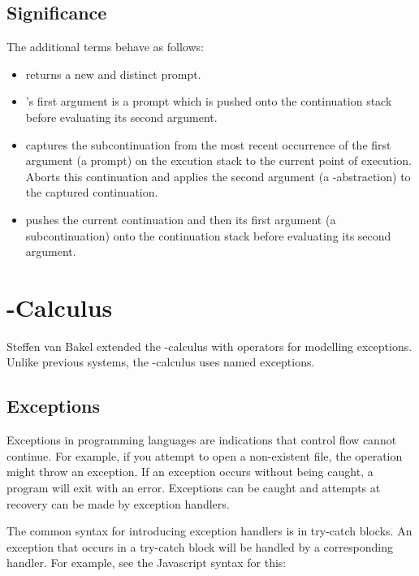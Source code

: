   \subsection{Significance}

  The additional terms behave as follows:
  \begin{itemize}
  \item {} returns a new and distinct prompt.
  \item {}'s first argument is a prompt which is pushed onto the continuation stack before evaluating its second argument. 
  \item {} captures the subcontinuation from the most recent occurrence of the first argument (a prompt) on the excution stack to the current point of execution. Aborts this continuation and applies the second argument (a \lam-abstraction) to the captured continuation.
  \item {} pushes the current continuation and then its first argument (a subcontinuation) onto the continuation stack before evaluating its second argument.
  \end{itemize}
  
\section{\ltry-Calculus}

Steffen van Bakel extended the \lam-calculus with operators for modelling exceptions.
Unlike previous systems, the \ltry-calculus uses named exceptions.

\subsection{Exceptions}

Exceptions in programming languages are indications that control flow cannot continue.
For example, if you attempt to open a non-existent file,
the operation might throw an exception.
If an exception occurs without being caught, a program will exit with an error.
Exceptions can be caught and attempts at recovery can be made by exception handlers.

The common syntax for introducing exception handlers is in try-catch blocks.
An exception that occurs in a try-catch block will be handled by a corresponding handler.
For example, see the Javascript syntax for this:

